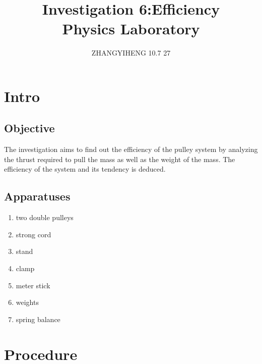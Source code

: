 \documentclass[12pt,a4paper]{article}
\author{ZHANGYIHENG 10.7 27}
\title{\Huge{\textbf{Investigation 6:Efficiency}} \\ \large{Physics Laboratory}}
\date{}
\begin{document}
\setmainfont{Times New Roman}
\setsansfont{Times New Roman}
\begin{spacing}{1.25}
\maketitle
\tableofcontents
\setlength{\parindent}{4ex}
\newpage
\section{Intro}
\subsection{Objective}
The investigation aims to find out the efficiency of the pulley system by analyzing the thrust required to pull the mass as well as the weight of the mass. The efficiency of the system and its tendency is deduced.
\subsection{Apparatuses}
\begin{enumerate}
    \setlength{\itemsep}{-1ex}
    \setlength{\parsep}{-1ex}
    \setlength{\topsep}{-1em}
    \item two double pulleys
    \item strong cord
    \item stand
    \item clamp
    \item meter stick
    \item weights
    \item spring balance
\end{enumerate}
\section{Procedure}

\end{spacing}
\end{document}
